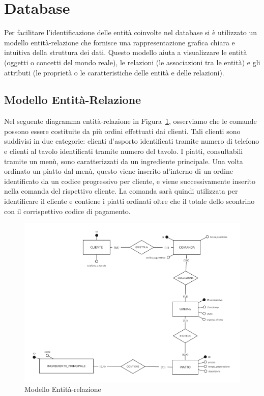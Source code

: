 \section{Database}
Per facilitare l'identificazione delle entità coinvolte nel database si è utilizzato un modello entità-relazione che fornisce una rappresentazione grafica chiara e intuitiva della struttura dei dati. Questo modello aiuta a visualizzare le entità (oggetti o concetti del mondo reale), le relazioni (le associazioni tra le entità) e gli attributi (le proprietà o le caratteristiche delle entità e delle relazioni).
\subsection{Modello Entità-Relazione}
Nel seguente diagramma entità-relazione in Figura~\ref{fig:er_diagram}, osserviamo che le comande possono essere costituite da più ordini effettuati dai clienti. Tali clienti sono suddivisi in due categorie: clienti d’asporto identificati tramite numero di telefono e clienti al tavolo identificati tramite numero del tavolo. I piatti, consultabili tramite un menù, sono caratterizzati da un ingrediente principale. Una volta ordinato un piatto dal menù, questo viene inserito al’interno di un ordine identificato da un codice progressivo per cliente, e viene successivamente inserito nella comanda del rispettivo cliente. La comanda sarà quindi utilizzata per identificare il cliente e contiene i piatti ordinati oltre che il totale dello scontrino con il corrispettivo codice di pagamento.

\begin{figure}[H]
	\centering
	\includegraphics[scale=0.4]{iterazione1/images/ER_project_c.png}
	\caption{Modello Entità-relazione\label{fig:er_diagram}}
\end{figure}

